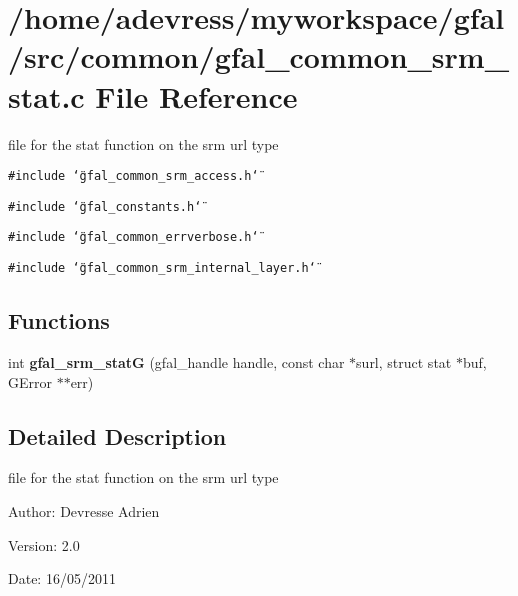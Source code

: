 \section{/home/adevress/myworkspace/gfal/src/common/gfal\_\-common\_\-srm\_\-stat.c File Reference}
\label{gfal__common__srm__stat_8c}
file for the stat function on the srm url type 

{\tt \#include \char`\"{}gfal\_\-common\_\-srm\_\-access.h\char`\"{}}\par
{\tt \#include \char`\"{}gfal\_\-constants.h\char`\"{}}\par
{\tt \#include \char`\"{}gfal\_\-common\_\-errverbose.h\char`\"{}}\par
{\tt \#include \char`\"{}gfal\_\-common\_\-srm\_\-internal\_\-layer.h\char`\"{}}\par
\subsection*{Functions}
\begin{CompactItemize}
\item 
int \textbf{gfal\_\-srm\_\-stat\-G} (gfal\_\-handle handle, const char $\ast$surl, struct stat $\ast$buf, GError $\ast$$\ast$err)\label{gfal__common__srm__stat_8c_79b8e4b087251577b48119392e4daa35}

\end{CompactItemize}


\subsection{Detailed Description}
file for the stat function on the srm url type 

\begin{Desc}
\item[Author:]Devresse Adrien \end{Desc}
\begin{Desc}
\item[Version:]2.0 \end{Desc}
\begin{Desc}
\item[Date:]16/05/2011 \end{Desc}
